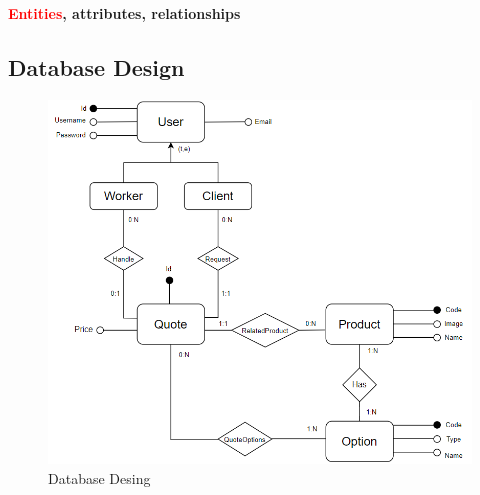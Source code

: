 \documentclass[a4paper, 12pt]{article}
\begin{document}
\noindent \textbf{\textcolor{red}{Entities}, \textcolor{myGreen}{attributes}, \textcolor{myBlue}{relationships}}
\newpage
\subsection{Database Design}
\begin{figure}[h!]
	\centering
	\includegraphics[width=1\textwidth]{PureHTML_images/quotemanagementdesign.png}
	\caption{Database Desing}
	\label{figure:database_design}
\end{figure}
\end{document}
